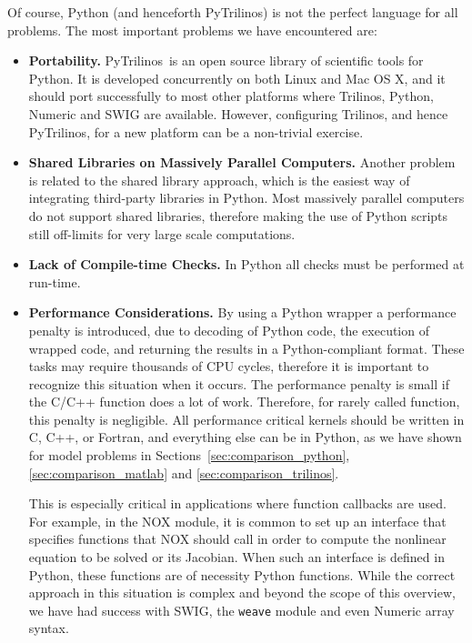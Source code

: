 \documentclass[10pt,relax]{SANDreport}
\newcommand{\PyTrilinos}{{PyTrilinos}}
\begin{document}
\smallskip

Of course, Python (and henceforth PyTrilinos) is not the
perfect language for all problems. The most important problems we have
encountered are:

\begin{itemize}

\item {\bf Portability.} \PyTrilinos\ is an open source library of
  scientific tools for Python.  It is developed concurrently on both
  Linux and Mac OS X, and it should port successfully to most other
  platforms where Trilinos, Python, Numeric and SWIG are
  available. However, configuring Trilinos, and hence \PyTrilinos, for
  a new platform can be a non-trivial exercise.

\item {\bf Shared Libraries on Massively Parallel Computers.} Another
  problem is related to the shared library approach, which is the
  easiest way of integrating third-party libraries in Python. Most
  massively parallel computers do not support shared libraries,
  therefore making the use of Python scripts still off-limits for very
  large scale computations.

\item {\bf Lack of Compile-time Checks.} In Python all checks must be
  performed at run-time.

\item {\bf Performance Considerations.}  By using a Python wrapper a
  performance penalty is introduced, due to decoding of Python code,
  the execution of wrapped code, and returning the results in a
  Python-compliant format. These tasks may require thousands of CPU
  cycles, therefore it is important to recognize this situation when
  it occurs.  The performance penalty is small if the C/C++ function
  does a lot of work.  Therefore, for rarely called function, this
  penalty is negligible.  All performance critical kernels should be
  written in C, C++, or Fortran, and everything else can be in Python, as we
  have shown for model problems in Sections~\ref{sec:comparison_python},
  \ref{sec:comparison_matlab} and \ref{sec:comparison_trilinos}.

  This is especially critical in applications where function callbacks
  are used.  For example, in the NOX module, it is common to set up an
  interface that specifies functions that NOX should call in order to
  compute the nonlinear equation to be solved or its Jacobian.  When
  such an interface is defined in Python, these functions are of
  necessity Python functions.  While the correct approach in this
  situation is complex and beyond the scope of this overview, we have
  had success with SWIG, the {\tt weave} module and even Numeric array
  syntax.


\end{itemize}
\end{document}
